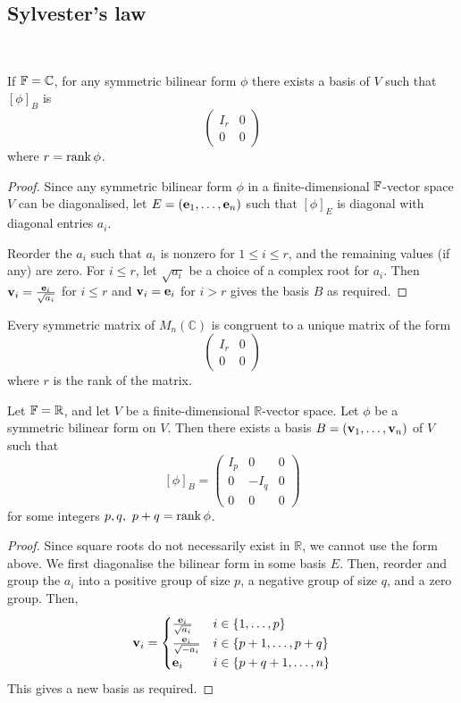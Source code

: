 \documentclass[a4paper]{article}
\begin{document}
\subsection{Sylvester's law}
\ \vspace*{-1.5em}
\begin{corollary}
	If \( {\mathbb{F}} = \mathbb C \), for any symmetric bilinear form \( \phi \) there exists a basis of \( V \) such that \( [\phi]_B \) is
	\[
		\begin{pmatrix}
			I_r & 0 \\
			0   & 0
		\end{pmatrix}
	\]
	where $ r = \rank \phi $. 
\end{corollary}
\begin{proof}
	Since any symmetric bilinear form \( \phi \) in a finite-dimensional \( {\mathbb{F}} \)-vector space \( V \) can be diagonalised, let \( E = ({\bf e}_1, \dots, {\bf e}_n) \) such that \( [\phi]_E \) is diagonal with diagonal entries \( a_i \).

	Reorder the \( a_i \) such that \( a_i \) is nonzero for \( 1 \leq i \leq r \), and the remaining values (if any) are zero.
	For \( i \leq r \), let \( \sqrt{a_i} \) be a choice of a complex root for \( a_i \).
	Then \( {\bf v}_i = \frac{{\bf e}_i}{\sqrt{a_i}} \) for \( i \leq r \) and \( {\bf v}_i = {\bf e}_i \) for \( i > r \) gives the basis \( B \) as required.
\end{proof}
\begin{corollary}
	Every symmetric matrix of \( M_n(\mathbb C) \) is congruent to a unique matrix of the form
	\[
		\begin{pmatrix}
			I_r & 0 \\
			0   & 0
		\end{pmatrix}
	\]
	where \( r \) is the rank of the matrix.
\end{corollary}
\begin{corollary}
	Let \( {\mathbb{F}} = \mathbb R \), and let \( V \) be a finite-dimensional \( \mathbb R \)-vector space.
	Let \( \phi \) be a symmetric bilinear form on \( V \).
	Then there exists a basis \( B = ({\bf v}_1, \dots, {\bf v}_n) \) of \( V \) such that
	\[
		[\phi]_B = \begin{pmatrix}
			I_p & 0    & 0 \\
			0   & -I_q & 0 \\
			0   & 0    & 0
		\end{pmatrix}
	\]
	for some integers \( p, q ,\ p+q = \rank \phi\).
\end{corollary}
\begin{proof}
	Since square roots do not necessarily exist in \( \mathbb R \), we cannot use the form above.
	We first diagonalise the bilinear form in some basis \( E \).
	Then, reorder and group the \( a_i \) into a positive group of size \( p \), a negative group of size \( q \), and a zero group.
	Then,
	\[
		{\bf v}_i = \begin{cases}
			\frac{{\bf e}_i}{\sqrt{a_i}}  & i \in \qty{1, \dots, p}     \\
			\frac{{\bf e}_i}{\sqrt{-a_i}} & i \in \qty{p+1, \dots, p+q} \\
			{\bf e}_i                     & i \in \qty{p+q+1, \dots, n}
		\end{cases}
	\]
	This gives a new basis as required.
\end{proof}
\end{document}
